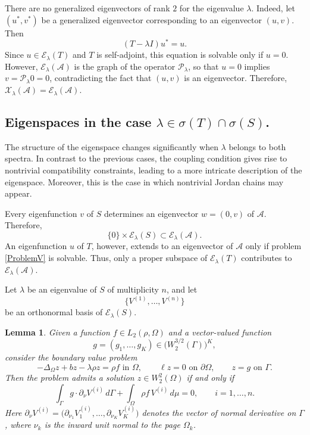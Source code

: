 \documentclass[reqno]{amsart}
\newtheorem{lem}{Lemma}
\theoremstyle{definition}
\theoremstyle{remark}
\numberwithin{equation}{section}
\newcommand{\cA}{\mathcal{A}}
\newcommand{\cE}{\mathcal{E}}
\newcommand{\cP}{\mathcal{P}}
\newcommand{\cX}{\mathcal{X}}
\begin{document}
There are no generalized eigenvectors of rank $2$ for the eigenvalue $\lambda$. Indeed, let $(u^*,v^*)$ be a generalized eigenvector corresponding to an eigenvector $(u,v)$. Then
\begin{equation}\label{TUStarU}
(T-\lambda I)u^*=u.
\end{equation}
Since $u\in\cE_\lambda(T)$ and $T$ is self-adjoint, this equation is solvable only if $u=0$. However, $\cE_\lambda(\cA)$ is the graph of the operator $\cP_\lambda$, so that $u=0$ implies $v=\cP_\lambda0=0$, contradicting the fact that $(u,v)$ is an eigenvector. Therefore, $\cX_\lambda(\cA)=\cE_\lambda(\cA)$.



\subsection{Eigenspaces in the case $\lambda\in\sigma(T)\cap\sigma(S)$.}
The structure of the eigenspace changes significantly when $\lambda$ belongs to both spectra. In contrast to the previous cases, the coupling condition gives rise to nontrivial compatibility constraints, leading to a more intricate description of the eigenspace. Moreover, this is the case in which nontrivial Jordan chains may appear.

Every eigenfunction $v$ of $S$ determines an eigenvector $w=(0,v)$ of $\cA$. Therefore,
\begin{equation*}
\{0\}\times\cE_\lambda(S)\subset\cE_\lambda(\cA).
\end{equation*}
An eigenfunction $u$ of $T$, however, extends to an eigenvector of $\cA$ only if problem \eqref{ProblemV} is solvable. Thus, only a proper subspace of $\cE_\lambda(T)$ contributes to $\cE_\lambda(\cA)$.

Let $\lambda$ be an eigenvalue of $S$ of multiplicity $n$, and let 
\begin{equation}\label{BasisS}
    \big\{V^{(1)},\dots,V^{(n)}\big\}
\end{equation}
be an orthonormal basis of $\cE_\lambda(S)$.


\begin{lem}\label{PropSolvabilityBook}
Given a function $f\in L_2(\rho,\Omega)$ and a vector-valued function
$$g=(g_1,\dots,g_K)\in \big(W_2^{3/2}(\Gamma)\big)^K,$$
consider the  boundary value problem
\begin{equation}\label{ProblemBookSolvability}
-\Delta_{\Omega}z+bz-\lambda\rho z=\rho f \text{ in }\Omega,\qquad \ell z=0 \text{ on }\partial\Omega,\qquad
z=g \text{ on }\Gamma.
\end{equation}
Then the problem admits a solution $z\in W_2^2(\Omega)$ if and only if
\begin{equation}\label{BookSolvabilityCond}
 \int_\Gamma g\cdot\partial_\nu V^{(i)}\,d\Gamma + \int_{\Omega} \rho f\,V^{(i)}\,d\mu=0,
\qquad
i=1,\dots,n.
\end{equation}
Here $\partial_\nu V^{(i)}=\bigl(\partial_{\nu_1}V^{(i)}_1,\dots,\partial_{\nu_K}V^{(i)}_K\bigr)$ denotes the vector of normal derivative on $\Gamma$, where
$\nu_k$ is the inward unit normal to the page $\Omega_k$.
\end{lem}
\end{document}

